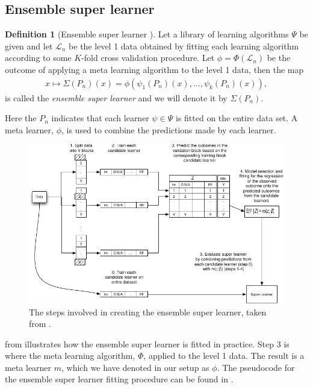 \documentclass[11pt, a4paper]{article}
\theoremstyle{definition}
\newtheorem{definition}[theorem]{Definition}
\theoremstyle{remark}
\newcommand{\la}{\psi}
\newcommand{\lib}{\Psi}
\newcommand{\lone}{\mathcal{L}}
\newcommand{\meta}{\phi}
\newcommand{\Meta}{\Phi}
\newcommand{\esl}{\Sigma}
\begin{document}
\subsection{Ensemble super learner}
\begin{definition}[Ensemble super learner \parencite{van2007super}]
    Let a library of learning algorithms $ \lib $ be given and let $ \lone_{n} $ be the level 1 data obtained by fitting each learning algorithm according to some $ K $-fold cross validation procedure. Let $ \meta = \Meta(\lone_{n}) $ be the outcome of applying a meta learning algorithm to the level 1 data, then the map 
    \begin{align*}
       x \mapsto \esl(P_n)(x) = \meta(\la_1(P_{n})(x), \ldots, \la_k(P_{n})(x) ),
    \end{align*}
    is called the \textit{ensemble super learner} and we will denote it by $ \esl(P_{n}) $. 
\end{definition}
Here the $ P_n $ indicates that each learner $ \la \in \lib $ is fitted on the entire data set. A meta learner, $ \meta $, is used to combine the predictions made by each learner. 
\begin{figure}[H]
    \centering
    \includegraphics[width=\textwidth]{figures/esldiagram.pdf}
    \caption{The steps involved in creating the ensemble super learner, taken from \citet{van2007super}.}
    \label{fig:esldiagram}
\end{figure}
 from \citet{van2007super} illustrates how the ensemble super learner is fitted in practice. Step 3 is where the meta learning algorithm, $ \Meta $, applied to the level 1 data. The result is a meta learner $ m $, which we have denoted in our setup as $ \phi $. The pseudocode for the ensemble super learner fitting procedure can be found in .
\end{document}
